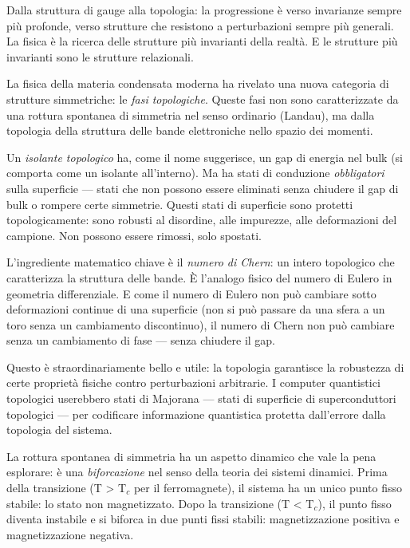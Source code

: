 \documentclass[12pt,a4paper,openany]{book}
\newcommand{\sezione}[1]{\vspace{1.2em}{\large\bfseries #1}\vspace{0.5em}\par}
\begin{document}
Dalla struttura di gauge alla topologia: la progressione è verso invarianze sempre più profonde, verso strutture che resistono a perturbazioni sempre più generali. La fisica è la ricerca delle strutture più invarianti della realtà. E le strutture più invarianti sono le strutture relazionali.

\sezione{Le fasi topologiche della materia: simmetrie invisibili}

La fisica della materia condensata moderna ha rivelato una nuova categoria di strutture simmetriche: le \textit{fasi topologiche}. Queste fasi non sono caratterizzate da una rottura spontanea di simmetria nel senso ordinario (Landau), ma dalla topologia della struttura delle bande elettroniche nello spazio dei momenti.

Un \textit{isolante topologico} ha, come il nome suggerisce, un gap di energia nel bulk (si comporta come un isolante all'interno). Ma ha stati di conduzione \textit{obbligatori} sulla superficie --- stati che non possono essere eliminati senza chiudere il gap di bulk o rompere certe simmetrie. Questi stati di superficie sono protetti topologicamente: sono robusti al disordine, alle impurezze, alle deformazioni del campione. Non possono essere rimossi, solo spostati.

L'ingrediente matematico chiave è il \textit{numero di Chern}: un intero topologico che caratterizza la struttura delle bande. È l'analogo fisico del numero di Eulero in geometria differenziale. E come il numero di Eulero non può cambiare sotto deformazioni continue di una superficie (non si può passare da una sfera a un toro senza un cambiamento discontinuo), il numero di Chern non può cambiare senza un cambiamento di fase --- senza chiudere il gap.

Questo è straordinariamente bello e utile: la topologia garantisce la robustezza di certe proprietà fisiche contro perturbazioni arbitrarie. I computer quantistici topologici userebbero stati di Majorana --- stati di superficie di superconduttori topologici --- per codificare informazione quantistica protetta dall'errore dalla topologia del sistema.

\sezione{L'ordine dal disordine: la rottura di simmetria come biforcazione}

La rottura spontanea di simmetria ha un aspetto dinamico che vale la pena esplorare: è una \textit{biforcazione} nel senso della teoria dei sistemi dinamici. Prima della transizione (T > T$_c$ per il ferromagnete), il sistema ha un unico punto fisso stabile: lo stato non magnetizzato. Dopo la transizione (T < T$_c$), il punto fisso diventa instabile e si biforca in due punti fissi stabili: magnetizzazione positiva e magnetizzazione negativa.
\end{document}

